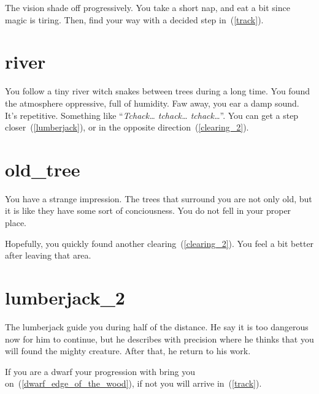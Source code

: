 The vision shade off progressively. You take a short nap, and eat a bit
since magic is tiring. Then, find your way with a decided step in~(\ref{track}).

\section{river}

You follow a tiny river witch snakes between trees during a long time. You found
the atmosphere oppressive, full of humidity. Faw away, you ear a damp sound.
It's repetitive. Something like ``\textit{Tchack… tchack… tchack…}''. You can
get a step closer~(\ref{lumberjack}), or in the opposite
direction~(\ref{clearing_2}).

\section{old_tree}

You have a strange impression. The trees that surround you are not only old, but
it is like they have some sort of conciousness. You do not fell in your proper
place.

Hopefully, you quickly found another clearing~(\ref{clearing_2}). You feel a bit
better after leaving that area.

\section{lumberjack_2}

The lumberjack guide you during half of the distance. He say it is too dangerous
now for him to continue, but he describes with precision where he thinks that you
will found the mighty creature. After that, he return to his work.

If you are a dwarf your progression with bring you
on~(\ref{dwarf_edge_of_the_wood}), if not you will arrive in~(\ref{track}).
